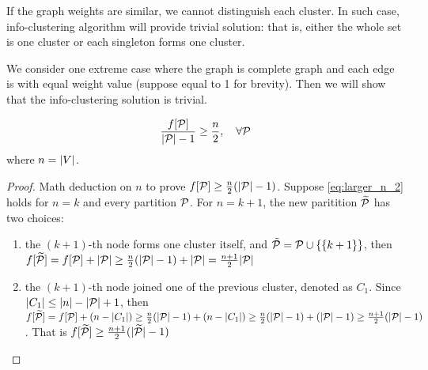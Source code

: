\documentclass{article}
\begin{document}
If the graph weights are similar, we cannot distinguish each cluster. 
In such case, info-clustering algorithm will provide trivial solution: 
that is, either the whole set is one cluster or each singleton forms one cluster.

We consider one extreme case where the graph is complete graph and each edge is with equal weight value (suppose equal to 1 for brevity).
Then we will show that the info-clustering solution is trivial.

\begin{lemma}
\begin{equation}\label{eq:larger_n_2}
\frac{f[\P]}{\abs{\P}-1} \geq \frac{n}{2}, \quad\forall \P
\end{equation}
where $n = \abs{V}$.
\end{lemma}
\begin{proof}
Math deduction on $n$ to prove $f[\P] \geq \frac{n}{2}(\abs{\P} - 1)$.  Suppose \eqref{eq:larger_n_2} holds for $n=k$ and every partition $\P$. For $n=k+1$, the new paritition $\widetilde{\P}$ has two choices: 
\begin{enumerate}
\item the $(k+1)$-th node forms one cluster itself, and $\tilde{\P} = \P \cup \{\{k+1\}\}$, 
then $f[\widetilde{\P}] = f[\P] + \abs{\P} \geq \frac{n}{2}(\abs{\P}-1) + \abs{\P} = \frac{n+1}{2}\abs{\P} $
\item the $(k+1)$-th node joined one of the previous cluster, denoted as $C_1$. Since $\abs{C_1} \leq \abs{n}-\abs{\P} + 1$, then 
$f[\widetilde{\P}] = f[\P]+ (n-\abs{C_1}) \geq \frac{n}{2}(\abs{\P}-1) + (n-\abs{C_1}) \geq \frac{n}{2}(\abs{\P}-1) +(\abs{\P} - 1) \geq \frac{n+1}{2}(\abs{\P}-1)$. That is $f[\widetilde{\P}]  \geq \frac{n+1}{2}(\abs{\widetilde{\P}}-1)$
\end{enumerate}
\end{proof}
\end{document}
